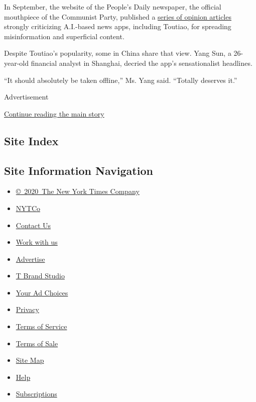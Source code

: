 In September, the website of the People's Daily newspaper, the official
mouthpiece of the Communist Party, published a
\href{http://opinion.people.com.cn/n1/2017/0918/c1003-29540709.html}{series
of opinion articles} strongly criticizing A.I.-based news apps,
including Toutiao, for spreading misinformation and superficial content.

Despite Toutiao's popularity, some in China share that view. Yang Sun, a
26-year-old financial analyst in Shanghai, decried the app's
sensationalist headlines.

``It should absolutely be taken offline,'' Ms. Yang said. ``Totally
deserves it.''

Advertisement

\protect\hyperlink{after-bottom}{Continue reading the main story}

\hypertarget{site-index}{%
\subsection{Site Index}\label{site-index}}

\hypertarget{site-information-navigation}{%
\subsection{Site Information
Navigation}\label{site-information-navigation}}

\begin{itemize}
\tightlist
\item
  \href{https://help.nytimes.com/hc/en-us/articles/115014792127-Copyright-notice}{©~2020~The
  New York Times Company}
\end{itemize}

\begin{itemize}
\tightlist
\item
  \href{https://www.nytco.com/}{NYTCo}
\item
  \href{https://help.nytimes.com/hc/en-us/articles/115015385887-Contact-Us}{Contact
  Us}
\item
  \href{https://www.nytco.com/careers/}{Work with us}
\item
  \href{https://nytmediakit.com/}{Advertise}
\item
  \href{http://www.tbrandstudio.com/}{T Brand Studio}
\item
  \href{https://www.nytimes.com/privacy/cookie-policy\#how-do-i-manage-trackers}{Your
  Ad Choices}
\item
  \href{https://www.nytimes.com/privacy}{Privacy}
\item
  \href{https://help.nytimes.com/hc/en-us/articles/115014893428-Terms-of-service}{Terms
  of Service}
\item
  \href{https://help.nytimes.com/hc/en-us/articles/115014893968-Terms-of-sale}{Terms
  of Sale}
\item
  \href{https://spiderbites.nytimes.com}{Site Map}
\item
  \href{https://help.nytimes.com/hc/en-us}{Help}
\item
  \href{https://www.nytimes.com/subscription?campaignId=37WXW}{Subscriptions}
\end{itemize}
